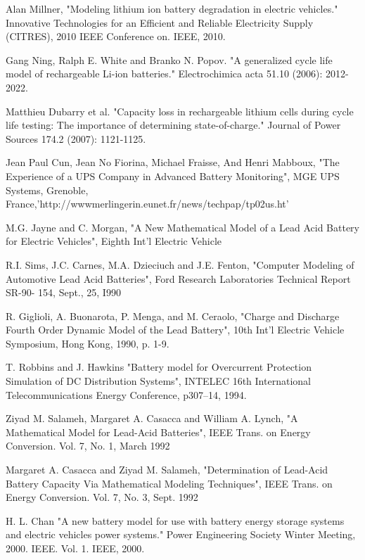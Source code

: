 

Alan Millner, "Modeling lithium ion battery degradation in electric vehicles." Innovative Technologies for an Efficient and Reliable Electricity Supply (CITRES), 2010 IEEE Conference on. IEEE, 2010.

Gang Ning, Ralph E. White and Branko N. Popov. "A generalized cycle life model of rechargeable Li-ion batteries." Electrochimica acta 51.10 (2006): 2012-2022.

Matthieu Dubarry et al. "Capacity loss in rechargeable lithium cells during cycle life testing: The importance of determining state-of-charge." Journal of Power Sources 174.2 (2007): 1121-1125.

Jean Paul Cun, Jean No Fiorina, Michael Fraisse, And Henri Mabboux, "The Experience of a
UPS Company in Advanced Battery Monitoring",
MGE UPS Systems, Grenoble, France,'http://wwwmerlingerin.eunet.fr/news/techpap/tp02us.ht'

M.G. Jayne and  C. Morgan, "A New
Mathematical Model of a Lead Acid Battery for
Electric Vehicles", Eighth Int'l Electric Vehicle


R.I. Sims, J.C. Carnes, M.A. Dzieciuch and
J.E. Fenton, "Computer Modeling of Automotive
Lead Acid Batteries", Ford Research Laboratories
Technical Report SR-90- 154, Sept., 25, I990

R. Giglioli, A. Buonarota, P. Menga, and M. Ceraolo, "Charge and Discharge Fourth
Order Dynamic Model of the Lead Battery", 10th Int'l
Electric Vehicle Symposium, Hong Kong, 1990, p. 1-9.

T. Robbins and J. Hawkins "Battery model for
Overcurrent Protection Simulation of DC Distribution Systems", INTELEC 16th
International Telecommunications Energy
Conference, p307--14, 1994.

Ziyad M. Salameh, Margaret A. Casacca and William
A. Lynch, "A Mathematical Model for Lead-Acid
Batteries", IEEE Trans. on Energy Conversion. Vol. 7,
No. 1, March 1992

Margaret A. Casacca and Ziyad M. Salameh,
"Determination of Lead-Acid Battery Capacity
Via Mathematical Modeling Techniques", IEEE
Trans. on Energy Conversion. Vol. 7, No. 3, Sept.
1992

H. L. Chan "A new battery model for use with battery energy storage systems and electric vehicles power systems." Power Engineering Society Winter Meeting, 2000. IEEE. Vol. 1. IEEE, 2000.


